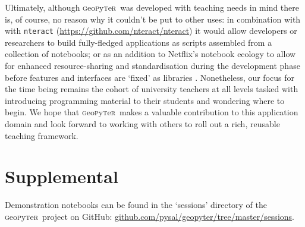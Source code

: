 \documentclass[letter, 11pt,titlepage]{article}
\newcommand{\gp}{\textsc{g}eo\textsc{p}y\textsc{t}e\textsc{r}~\/}
\begin{document}
Ultimately, although \gp was developed with teaching needs in mind there is, of course, no reason why it couldn't be put to other uses: in combination with with \texttt{nteract} (\url{https://github.com/nteract/nteract}) it would allow developers or researchers to build fully-fledged applications as scripts assembled from a collection of notebooks; or as an addition to Netflix's notebook ecology to allow for enhanced resource-sharing and standardisation during the development phase before features and interfaces are `fixed' as libraries \citep{Ufford2018}. Nonetheless, our focus for the time being remains the cohort of university teachers at all levels tasked with introducing programming material to their students and wondering where to begin. We hope that \gp makes a valuable contribution to this application domain and look forward to working with others to roll out a rich, reusable teaching framework.

\section{Supplemental}

Demonstration notebooks can be found in the `sessions' directory of the \gp project on GitHub: \href{https://github.com/pysal/geopyter/tree/master/sessions}{github.com/pysal/geopyter/tree/master/sessions}.



\end{document}
